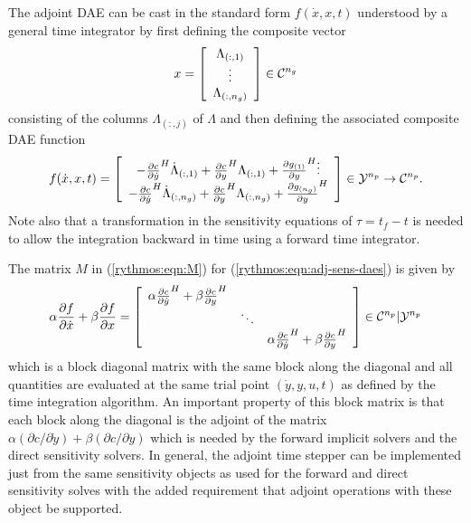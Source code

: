 \documentclass[pdf,ps2pdf,11pt]{SANDreport}
\begin{document}
The adjoint DAE can be cast in the standard form $f(\dot{x},x,t)$ understood
by a general time integrator by first defining the composite vector
%
\begin{equation}
x =
{\bmat{c}
\Lambda_{(:,1)} \\ \vdots \\ \Lambda_{(:,n_g)}
\emat}
\in \mathcal{C}^{n_g}
\end{equation}
%
consisting of the columns $\Lambda_{(:,j)}$ of $\Lambda$ and then defining the
associated composite DAE function
%
\begin{equation}
f(\dot{x},x,t) =
{\bmat{c}
%
- \frac{\partial c}{\partial \dot{y}}^H \dot{\Lambda}_{(:,1)}
+  \frac{\partial c}{\partial y}^H \Lambda_{(:,1)} + \frac{\partial g_{(1)}}{\partial y}^H
%
\vdots \\
%
- \frac{\partial c}{\partial \dot{y}}^H \dot{\Lambda}_{(:,n_g)}
+  \frac{\partial c}{\partial y}^H \Lambda_{(:,n_g)} + \frac{\partial g_{(n_g)}}{\partial y}^H
%
\emat}
\in \mathcal{Y}^{n_p} \rightarrow \mathcal{C}^{n_p}.
\label{rythmos:eqn:adj-sens-daes}
\end{equation}
%
Note also that a transformation in the sensitivity equations of $\tau = t_f -
t$ is needed to allow the integration backward in time using a forward time
integrator.

The matrix $M$ in (\ref{rythmos:eqn:M}) for
(\ref{rythmos:eqn:adj-sens-daes}) is given by
%
\begin{equation}
\alpha \frac{\partial f}{\partial \dot{x}} + \beta \frac{\partial f}{\partial x}
= 
{\bmat{ccc}
\alpha \frac{\partial c}{\partial \dot{y}}^H + \beta \frac{\partial c}{\partial y}^H \\
& \ddots \\
& & \alpha \frac{\partial c}{\partial \dot{y}}^H + \beta \frac{\partial c}{\partial y}^H
\emat}
\in \mathcal{C}^{n_p}|\mathcal{Y}^{n_p}
\label{rythmos:eqn:adj-sens-daes-jac}
\end{equation}
%
which is a block diagonal matrix with the same block along the diagonal and
all quantities are evaluated at the same trial point $(\dot{y},y,u,t)$ as
defined by the time integration algorithm.  An important property of this
block matrix is that each block along the diagonal is the adjoint of the
matrix ${}\alpha (\partial c / {}\partial {}\dot{y}) + {}\beta (\partial c /
{}\partial y)$ which is needed by the forward implicit solvers and the direct
sensitivity solvers.  In general, the adjoint time stepper can be implemented
just from the same sensitivity objects as used for the forward and direct
sensitivity solves with the added requirement that adjoint operations with
these object be supported.
\end{document}
